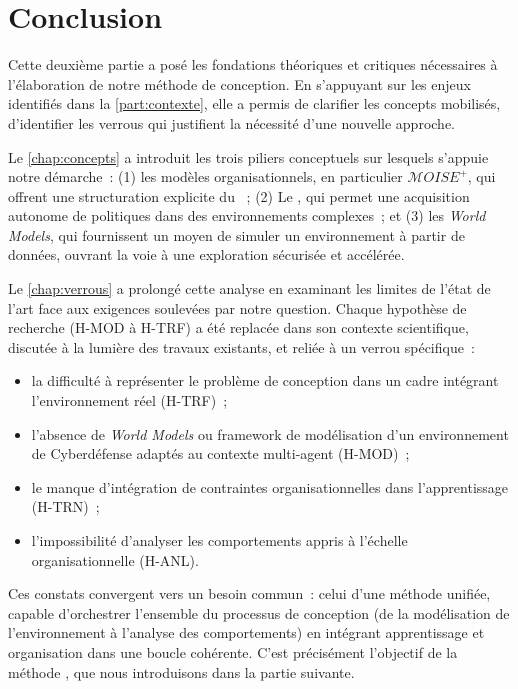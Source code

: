 \chapter*{Conclusion}

\noindent
Cette deuxième partie a posé les fondations théoriques et critiques nécessaires à l'élaboration de notre méthode de conception. En s'appuyant sur les enjeux identifiés dans la \autoref{part:contexte}, elle a permis de clarifier les concepts mobilisés, d'identifier les verrous qui justifient la nécessité d'une nouvelle approche.

\medskip

\noindent
Le \autoref{chap:concepts} a introduit les trois piliers conceptuels sur lesquels s'appuie notre démarche~: (1) les modèles organisationnels, en particulier \textit{$\mathcal{M}OISE^+$}, qui offrent une structuration explicite du ~; (2) Le , qui permet une acquisition autonome de politiques dans des environnements complexes~; et (3) les \textit{World Models}, qui fournissent un moyen de simuler un environnement à partir de données, ouvrant la voie à une exploration sécurisée et accélérée.

\noindent
Le \autoref{chap:verrous} a prolongé cette analyse en examinant les limites de l'état de l'art face aux exigences soulevées par notre question. Chaque hypothèse de recherche (H-MOD à H-TRF) a été replacée dans son contexte scientifique, discutée à la lumière des travaux existants, et reliée à un verrou spécifique~:
\begin{itemize}
  \item la difficulté à représenter le problème de conception dans un cadre intégrant l'environnement réel (H-TRF)~;
  \item l'absence de \textit{World Models} ou framework de modélisation d'un environnement de Cyberdéfense adaptés au contexte multi-agent (H-MOD)~;
  \item le manque d'intégration de contraintes organisationnelles dans l'apprentissage (H-TRN)~;
  \item l'impossibilité d'analyser les comportements appris à l'échelle organisationnelle (H-ANL).
\end{itemize}

\medskip

\noindent
Ces constats convergent vers un besoin commun~: celui d'une méthode unifiée, capable d'orchestrer l'ensemble du processus de conception (de la modélisation de l'environnement à l'analyse des comportements) en intégrant apprentissage et organisation dans une boucle cohérente. C'est précisément l'objectif de la méthode , que nous introduisons dans la partie suivante.
